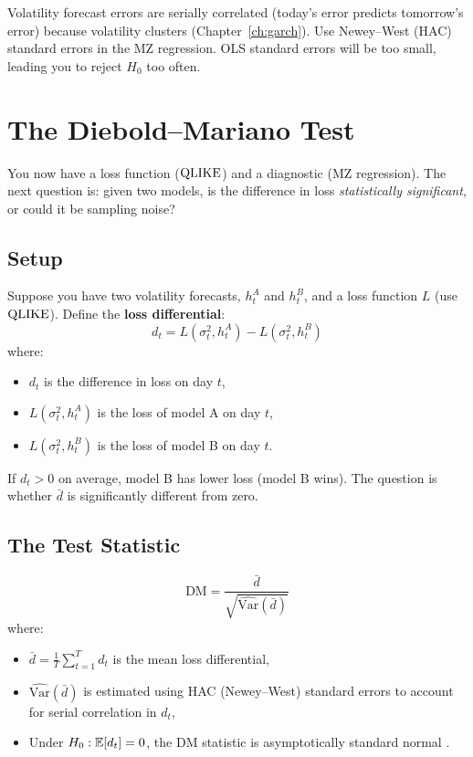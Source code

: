 \begin{warning}
Volatility forecast errors are serially correlated (today's error predicts tomorrow's error) because volatility clusters (Chapter~\ref{ch:garch}).
Use Newey--West (HAC) standard errors in the MZ regression.
OLS standard errors will be too small, leading you to reject $H_0$ too often.
\end{warning}


\section{The Diebold--Mariano Test}
\label{sec:eval-dm}

You now have a loss function ($\operatorname{QLIKE}$) and a diagnostic (MZ regression).
The next question is: given two models, is the difference in loss \emph{statistically significant}, or could it be sampling noise?

\subsection{Setup}

Suppose you have two volatility forecasts, $h^A_t$ and $h^B_t$, and a loss function $L$ (use $\operatorname{QLIKE}$).
Define the \textbf{loss differential}:
\begin{equation}
\label{eq:dm-diff}
d_t = L(\sigma^2_t, h^A_t) - L(\sigma^2_t, h^B_t)
\end{equation}
where:
\begin{itemize}[nosep]
  \item $d_t$ is the difference in loss on day $t$,
  \item $L(\sigma^2_t, h^A_t)$ is the loss of model A on day $t$,
  \item $L(\sigma^2_t, h^B_t)$ is the loss of model B on day $t$.
\end{itemize}

If $d_t > 0$ on average, model B has lower loss (model B wins).
The question is whether $\bar{d}$ is significantly different from zero.

\subsection{The Test Statistic}

\begin{equation}
\label{eq:dm-stat}
\text{DM} = \frac{\bar{d}}{\sqrt{\widehat{\text{Var}}(\bar{d})}}
\end{equation}
where:
\begin{itemize}[nosep]
  \item $\bar{d} = \frac{1}{T}\sum_{t=1}^T d_t$ is the mean loss differential,
  \item $\widehat{\text{Var}}(\bar{d})$ is estimated using HAC (Newey--West) standard errors to account for serial correlation in $d_t$,
  \item Under $H_0: \mathbb{E}[d_t] = 0$, the DM statistic is asymptotically standard normal \citep{DieboldMariano1995}.
\end{itemize}

